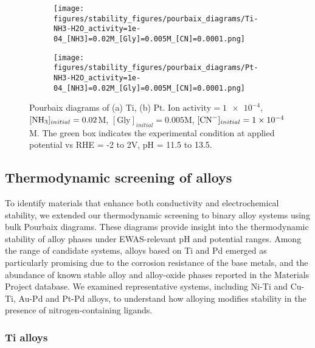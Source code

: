 \documentclass[journal=jacsat,manuscript=article]{achemso}
\begin{document}
\begin{figure}[htbp]
    \centering
    \begin{subfigure}[b]{0.45\textwidth}
        \subcaption{}\label{fig:Ti_Pourbaix_NH3_Gly_CN}
        \texttt{[image: figures/stability\_figures/pourbaix\_diagrams/Ti-NH3-H2O\_activity=1e-04\_[NH3]=0.02M\_[Gly]=0.005M\_[CN]=0.0001.png]}
    \end{subfigure}
    \begin{subfigure}[b]{0.45\textwidth}
        \subcaption{}\label{fig:Pt_Pourbaix_NH3_Gly_CN}
        \texttt{[image: figures/stability\_figures/pourbaix\_diagrams/Pt-NH3-H2O\_activity=1e-04\_[NH3]=0.02M\_[Gly]=0.005M\_[CN]=0.0001.png]}
    \end{subfigure}
    \caption{Pourbaix diagrams of (a) Ti, (b) Pt. $\text{Ion activity}=\num{1e-4}$, $[\ce{NH3}]_{initial}= 0.02$M, $[\text{Gly}]_{initial}=0.005$M,  $[\ce{CN-}]_{initial}=\num{1e-4}$M. The green box indicates the experimental condition at applied potential vs RHE = -2 to 2V, pH = 11.5 to 13.5.}
    \label{fig:Ti_Pt_Pourbaix}
\end{figure}


\subsection{Thermodynamic screening of alloys} \label{sec:alloy_screening}

To identify materials that enhance both conductivity and electrochemical stability, we extended our thermodynamic screening to binary alloy systems using bulk Pourbaix diagrams. These diagrams provide insight into the thermodynamic stability of alloy phases under EWAS-relevant pH and potential ranges. Among the range of candidate systems, alloys based on Ti and Pd emerged as particularly promising due to the corrosion resistance of the base metals, and the abundance of known stable alloy and alloy-oxide phases reported in the Materials Project database. We examined representative systems, including Ni-Ti and Cu-Ti, Au-Pd and Pt-Pd alloys, to understand how alloying modifies stability in the presence of nitrogen-containing ligands. 




\subsubsection{Ti alloys}
\end{document}
